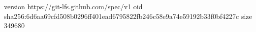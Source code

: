 version https://git-lfs.github.com/spec/v1
oid sha256:6d6aa69cfd508b0296ff401ead6795822fb246c58e9a74e59192b33f0bf4227c
size 349680
